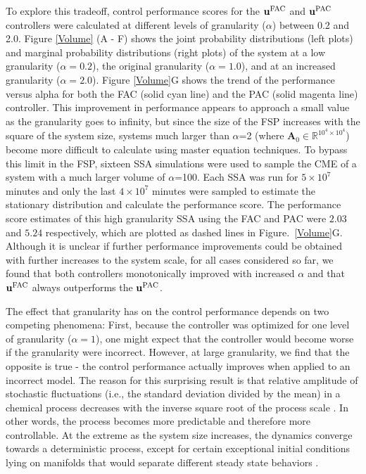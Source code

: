 \documentclass[12pt]{iopart}
\begin{document}
To explore this tradeoff, control performance scores for the $\mathbf{u}^{\rm FAC}$ and $\mathbf{u}^{\rm PAC}$ controllers were calculated at different levels of granularity ($\alpha$) between 0.2 and 2.0.  Figure \ref{Volume} (A - F) shows the joint probability distributions (left plots) and marginal probability distributions (right plots) of the system at a low granularity ($\alpha=0.2$), the original granularity ($\alpha=1.0$), and at an increased granularity ($\alpha=2.0$). 
Figure \ref{Volume}G shows the trend of the performance versus alpha for both the FAC (solid cyan line) and the PAC (solid magenta line) controller.  This improvement in performance appears to approach a small value as the granularity goes to infinity, but since the size of the FSP increases with the square of the system size, systems much larger than $\alpha$=2 (where $\mathbf{A}_0\in \mathbb{R}^{10^4\times10^4}$) become more difficult to calculate using master equation techniques. To bypass this limit in the FSP, sixteen SSA simulations were used to sample the CME of a system with a much larger volume of $\alpha$=100. Each SSA was run for $5\times10^7$ minutes and only the last $4\times10^7$ minutes were sampled to estimate the stationary distribution and calculate the performance score. The performance score estimates of this high granularity SSA using the FAC and PAC were $2.03$ and $5.24$ respectively, which are plotted as dashed lines in Figure.\ \ref{Volume}G. Although it is unclear if further performance improvements could be obtained with further increases to the system scale, for all cases considered so far, we found that both controllers monotonically improved with increased $\alpha$ and that $\mathbf{u}^{\rm FAC}$ always outperforms the $\mathbf{u}^{\rm PAC}$. 

The effect that granularity has on the control performance depends on two competing phenomena: First, because the controller was optimized for one level of granularity ($\alpha = 1$), one might expect that the controller would become worse if the granularity were incorrect. However, at large granularity, we find that the opposite is true - the control performance actually improves when applied to an incorrect model. The reason for this surprising result is that relative amplitude of stochastic fluctuations (i.e., the standard deviation divided by the mean) in a chemical process decreases with the inverse square root of the process scale \cite{VanKampen1992}. In other words, the process becomes more predictable and therefore more controllable. At the extreme as the system size increases, the dynamics converge towards a deterministic process, except for certain exceptional initial conditions lying on manifolds that would separate different steady state behaviors \cite{Strasser2012}. 
\end{document}
